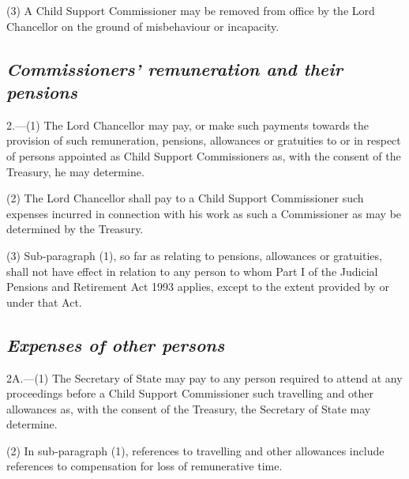 \documentclass[12pt,a4paper]{article}
\begin{document}
(3) A Child Support Commissioner may be removed from office by the Lord Chancellor on the ground of misbehaviour or incapacity.


\subsection*{\itshape Commissioners' remuneration and their pensions}

2.---(1) The Lord Chancellor may pay, or make such payments towards the provision of such remuneration, pensions, allowances or gratuities to or in respect of persons appointed as Child Support Commissioners as, with the consent of the Treasury, he may determine.

(2) The Lord Chancellor shall pay to a Child Support Commissioner such expenses incurred in connection with his work as such a Commissioner as may be determined by the Treasury.

(3) Sub-paragraph (1), so far as relating to pensions, allowances or gratuities, shall not have effect in relation to any person to whom Part I of the Judicial Pensions and Retirement Act 1993 applies, except to the extent provided by or under that Act.


\subsection*{\itshape Expenses of other persons}

2A.---(1) The Secretary of State may pay to any person required to attend at any proceedings before a Child Support Commissioner such travelling and other allowances as, with the consent of the Treasury, the Secretary of State may determine.


(2) In sub-paragraph (1), references to travelling and other allowances include references to compensation for loss of remunerative time.
\end{document}
